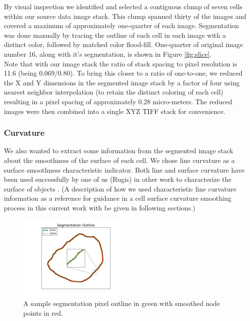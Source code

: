 \documentclass[a4paper,10pt]{article}
\begin{document}
By visual inspection we identified and selected a contiguous clump of seven cells within our source data image stack.  This clump spanned thirty of the images and covered a maximum of approximately one-quarter of each image. Segmentation was done manually by tracing the outline of each cell in each image with a distinct color, followed by matched color flood-fill. One-quarter of original image number 16, along with it's segmentation, is shown in Figure \ref{fig:slice}.\\

Note that with our image stack the ratio of stack spacing to pixel resolution is 11.6 (being 0.069/0.80). To bring this closer to a ratio of one-to-one, we reduced the X and Y dimensions in the segmented image stack by a factor of four using nearest neighbor interpolation (to retain the distinct coloring of each cell) resulting in a pixel spacing of approximately 0.28 micro-meters.  The reduced images were then combined into a single XYZ TIFF stack for convenience.\\

\subsubsection{Curvature}

We also wanted to extract some information from the segmented image stack about the smoothness of the surface of each cell. We chose line curvature as a surface smoothness characteristic indicator. Both line and surface curvature have been used successfully  by one of us (Rugis) in other work to characterize the surface of objects \cite{Rugis_2005_SCMMD, Rugis_2006_SRMRSD, Rugis_2006_SISCE}. (A description of how we used characteristic line curvature information as a reference for guidance in a cell surface curvature smoothing process in this current work with be given in following sections.)\\

\begin{figure}[H]
\begin{center}
\includegraphics[width=0.5\textwidth]{images/outline.pdf}
\end{center}
\vspace{-5mm}
\caption{A sample segmentation pixel outline in green with smoothed node points in red.}
\label{fig:slice_outline}
\end{figure}
\end{document}
